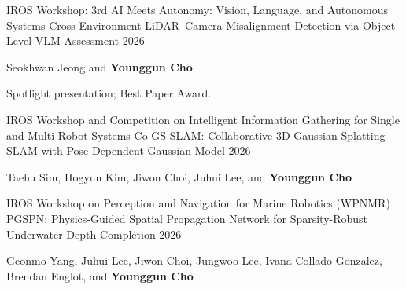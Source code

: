 \begin{cventries}
  \cventry
    {IROS Workshop: 3rd AI Meets Autonomy: Vision, Language, and Autonomous Systems}
    {Cross-Environment LiDAR--Camera Misalignment Detection via Object-Level VLM Assessment}
    {}{2026}
    {\begin{cvitems}
      \item {Seokhwan Jeong and \textbf{Younggun Cho}}
      \item {Spotlight presentation; Best Paper Award.}
    \end{cvitems}}

  \cventry
    {IROS Workshop and Competition on Intelligent Information Gathering for Single and Multi-Robot Systems}
    {Co-GS SLAM: Collaborative 3D Gaussian Splatting SLAM with Pose-Dependent Gaussian Model}
    {}{2026}
    {\begin{cvitems}
      \item {Taehu Sim, Hogyun Kim, Jiwon Choi, Juhui Lee, and \textbf{Younggun Cho}}
    \end{cvitems}}

  \cventry
    {IROS Workshop on Perception and Navigation for Marine Robotics (WPNMR)}
    {PGSPN: Physics-Guided Spatial Propagation Network for Sparsity-Robust Underwater Depth Completion}
    {}{2026}
    {\begin{cvitems}
      \item {Geonmo Yang, Juhui Lee, Jiwon Choi, Jungwoo Lee, Ivana Collado-Gonzalez, Brendan Englot, and \textbf{Younggun Cho}}
    \end{cvitems}}
\end{cventries}

